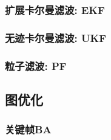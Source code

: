 \subsubsection{扩展卡尔曼滤波: EKF}
\subsubsection{无迹卡尔曼滤波: UKF}
\subsubsection{粒子滤波: PF}

\subsection{图优化}
\subsubsection{关键帧BA}
